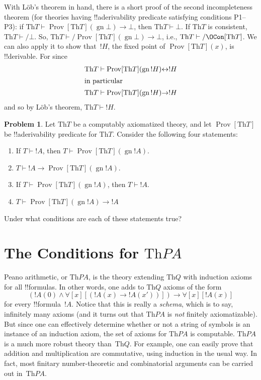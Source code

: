\documentclass[10pt,a4paper]{article}
\theoremstyle{plain}
\theoremstyle{definition}
\newtheorem{prob}{Problem}[section]
\theoremstyle{remark}
\newcommand*{\olfileid}[3]{}
\newcommand*{\olsection}[1]{\section*{#1}}
\providecommand{\lif}{\mathbin{\rightarrow}}
\providecommand{\lforall}{\mathord{\forall}}
\providecommand{\lfalse}{\bot}
\providecommand{\Proves}{\mathrel{\vdash}}
\providecommand{\Th}{\ensuremath{\mathrm{Th}}}
\providecommand{\gn}{\operatorname{gn}}
\providecommand{\liff}{\mathbin{\leftrightarrow}}
\providecommand{\OProv}{\operatorname{Prov}}
\begin{document}
With L\"ob's theorem in hand, there is a short proof of the second
incompleteness theorem (for theories having !!a{derivability} predicate
satisfying conditions P1--P3): if $\Th{T} \Proves
\OProv[\Th{T}](\gn{\lfalse}) \lif \lfalse$, then $\Th{T} \Proves \lfalse$.
If $\Th{T}$ is consistent, $\Th{T} \Proves/ \lfalse$. So, $\Th{T}
\Proves/ \OProv[\Th{T}](\gn{\lfalse}) \lif \lfalse$, i.e., $\Th{T} \Proves/
\OCon[\Th{T}]$.  We can also apply it to show that~$!H$, the fixed
point of $\OProv[\Th{T}](x)$, is !!{derivable}. For since
\begin{align*}
  \Th{T} & \Proves \OProv[\Th{T}](\gn{!H}) \liff !H\\
  \intertext{in particular}
    \Th{T} & \Proves \OProv[\Th{T}](\gn{!H}) \lif !H
\end{align*}
and so by L\"ob's theorem, $\Th{T} \Proves !H$.


\begin{prob}
Let $\Th{T}$ be a computably axiomatized theory, and
let $\OProv[\Th{T}]$ be !!a{derivability} predicate for $\Th{T}$. Consider the
following four statements:
\begin{enumerate}
\item If $T \Proves !A$, then $T \Proves \OProv[\Th{T}](\gn{!A})$.
\item $T \Proves !A \lif \OProv[\Th{T}](\gn{!A})$.
\item If $T \Proves \OProv[\Th{T}](\gn{!A})$, then $T \Proves !A$.
\item $T \Proves \OProv[\Th{T}](\gn{!A}) \lif !A$
\end{enumerate}
Under what conditions are each of these statements true?
\end{prob}





\olfileid{inc}{inp}{prc}

\olsection{The  Conditions for $\Th{PA}$}

Peano arithmetic, or $\Th{PA}$, is the theory extending $\Th{Q}$ with
induction axioms for all !!{formula}s. In other words, one adds to $\Th{Q}$
axioms of the form
\[
(!A(0) \land \lforall[x][(!A(x) \lif !A(x'))]) \lif \lforall[x][!A(x)]
\]
for every !!{formula}~$!A$. Notice that this is really a
\emph{schema}, which is to say, infinitely many axioms (and it turns
out that $\Th{PA}$ is {\em not} finitely axiomatizable). But since one
can effectively determine whether or not a string of symbols is an
instance of an induction axiom, the set of axioms for $\Th{PA}$ is
computable. $\Th{PA}$ is a much more robust theory than~$\Th{Q}$. For
example, one can easily prove that addition and multiplication are
commutative, using induction in the usual way. In fact, most finitary
number-theoretic and combinatorial arguments can be carried out
in~$\Th{PA}$.
\end{document}
